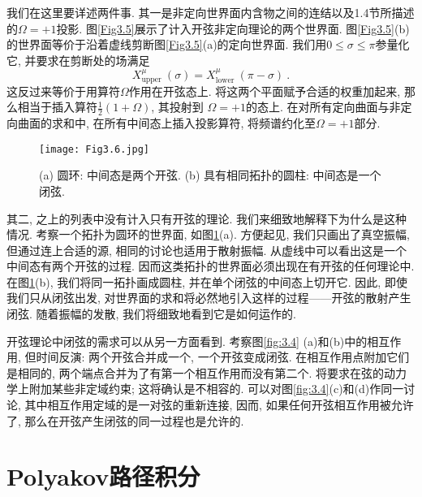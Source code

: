 我们在这里要详述两件事. 其一是非定向世界面内含物之间的连结以及1.4节所描述的$\Omega=+1$投影. 图\ref{Fig3.5}展示了计入开弦非定向理论的两个世界面. 图\ref{Fig3.5}(b)的世界面等价于沿着虚线剪断图\ref{Fig3.5}(a)的定向世界面. 我们用$0 \leq \sigma \leq \pi$参量化它, 并要求在剪断处的场满足
\begin{equation}
X_{\text {upper }}^{\mu}(\sigma)=X_{\text {lower }}^{\mu}(\pi-\sigma) \:. \label{3.1.2}
\end{equation}
这反过来等价于用算符$\Omega$作用在开弦态上. 将这两个平面赋予合适的权重加起来, 那么相当于插入算符$\frac{1}{2}(1+\Omega)$, 其投射到
$\Omega=+1$的态上. 在对所有定向曲面与非定向曲面的求和中, 在所有中间态上插入投影算符, 将频谱约化至$\Omega=+1$部分.

\begin{figure}[h]
	\begin{center}
		\texttt{[image: Fig3.6.jpg]}\\
\caption{(a) 圆环: 中间态是两个开弦. (b) 具有相同拓扑的圆柱: 中间态是一个闭弦.}\label{Fig3.6}
	\end{center}
\end{figure}

其二, 之上的列表中没有计入只有开弦的理论. 我们来细致地解释下为什么是这种情况.
考察一个拓扑为圆环的世界面, 如图\ref{Fig3.6}(a). 方便起见, 我们只画出了真空振幅, 但通过连上合适的源, 相同的讨论也适用于散射振幅. 从虚线中可以看出这是一个中间态有两个开弦的过程. 因而这类拓扑的世界面必须出现在有开弦的任何理论中. 在图\ref{Fig3.6}(b), 我们将同一拓扑画成圆柱, 并在单个闭弦的中间态上切开它. 因此, 即使我们只从闭弦出发, 对世界面的求和将必然地引入这样的过程——开弦的散射产生闭弦. 随着振幅的发散, 我们将细致地看到它是如何运作的.

开弦理论中闭弦的需求可以从另一方面看到. 考察图\ref{fig:3.4} (a)和(b)中的相互作用, 但时间反演: 两个开弦合并成一个, 一个开弦变成闭弦. 在相互作用点附加它们是相同的, 两个端点合并为了有第一个相互作用而没有第二个. 将要求在弦的动力学上附加某些非定域约束; 这将确认是不相容的. 可以对图\ref{fig:3.4}(c)和(d)作同一讨论, 其中相互作用定域的是一对弦的重新连接, 因而, 如果任何开弦相互作用被允许了, 那么在开弦产生闭弦的同一过程也是允许的.

\section{\texorpdfstring{Polyakov路径积分}{3.2 The Polyakov path integral}} \label{sec:3.2}

